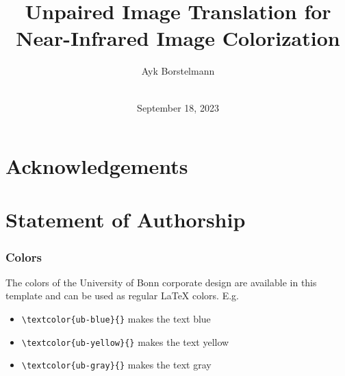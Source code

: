 \documentclass[ba,logo]{ivs-thesis}
\title{Unpaired Image Translation for Near-Infrared Image Colorization}
\author{Ayk Borstelmann\\\birthinfo{March 28, 2002 in Aschaffenburg}\\\matricnumber{3441004}}
\date{September 18, 2023}
\begin{document}
	
	\frontmatter 
	
	\maketitle 
	
	\cleardoublepage
	\begin{abstract}
		\blindtext[3]
	\end{abstract}

	\chapter*{Acknowledgements}  
	
	\cleardoublepage
	\chapter*{Statement of Authorship} 
	 
	
	\cleardoublepage
	\tableofcontents
	
	
	\mainmatter
	
	 
	
	
	
	 
	
	

	\subsection{Colors}
	The colors of the University of Bonn corporate design are available in this template and can be used as regular \LaTeX{} colors. E.g.
	\begin{itemize}
	\item \verb+\textcolor{ub-blue}{}+ \textcolor{ub-blue}{makes the text blue}
	\item \verb+\textcolor{ub-yellow}{}+ \textcolor{ub-yellow}{makes the text yellow}
	\item \verb+\textcolor{ub-gray}{}+ \textcolor{ub-gray}{makes the text gray}
	\end{itemize}
	
	 
	
	 
	
\end{document}
